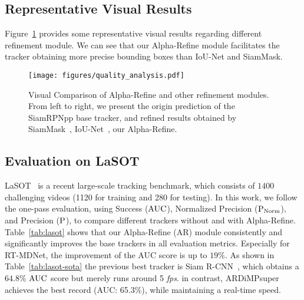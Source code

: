 \documentclass[final]{cvpr}
\begin{document}
\subsection{Representative Visual Results}
Figure~\ref{fig:visual} provides some representative visual results regarding different refinement 
module. We can see that our Alpha-Refine module facilitates the tracker obtaining more precise bounding 
boxes than IoU-Net and SiamMask.   
\vspace{-2mm}


\begin{figure}[!h]
\centering
    \texttt{[image: figures/quality\_analysis.pdf]}
\caption{Visual Comparison of Alpha-Refine and other refinement modules. From left to right, we present the origin prediction of the SiamRPNpp base tracker, and refined results obtained by SiamMask~\cite{SiamMask}, IoU-Net~\cite{ATOM,DiMP}, our Alpha-Refine.} \label{fig:visual}
    \vspace{-4mm}
\end{figure} 


\subsection{Evaluation on LaSOT}
\label{sec_lasot}
LaSOT~\cite{LaSOT} is a recent large-scale tracking benchmark, 
which consists of $1400$ challenging videos (1120 for training and 280 for testing). 
In this work, we follow the one-pass evaluation, using Success ($\rm{AUC}$), Normalized Precision 
($\rm{P_{Norm}}$), and Precision ($\rm{P}$), to compare different trackers without and with Alpha-Refine. 
Table~\ref{tab:lasot} shows that our Alpha-Refine (AR) module consistently and significantly 
improves the base trackers in all evaluation metrics. 
Especially for RT-MDNet, the improvement of the AUC score is up to $19\%$.
As shown in Table~\ref{tab:lasot-sota} the previous best tracker is Siam R-CNN~\cite{SiamRCNN}, which obtains a $64.8\%$ 
$\rm{AUC}$ score but merely runs around 5 \emph{fps}. 
in contrast, ARDiMPsuper achieves the best record (\rm{AUC}: 65.3\%), while maintaining a real-time speed. 
\end{document}
